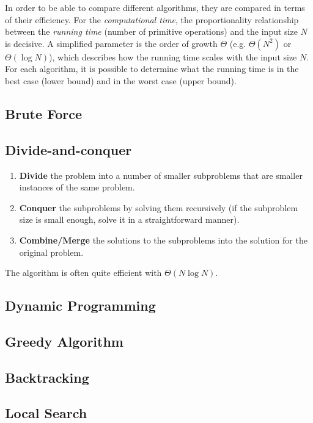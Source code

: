 

In order to be able to compare different algorithms, they are compared in terms of their efficiency. For the \emph{computational time}, the proportionality relationship between the \emph{running time} (number of primitive operations) and the input size $N$ is decisive. A simplified parameter is the order of growth $\Theta$ (e.g. $\Theta(N^2)$ or $\Theta(\log N)$), which describes how the running time scales with the input size $N$. For each algorithm, it is possible to determine what the running time is in the best case (lower bound) and in the worst case (upper bound).

\subsection{Brute Force}




\subsection{Divide-and-conquer}

\begin{enumerate}
    \item \textbf{Divide} the problem into a number of smaller subproblems that are smaller instances of the same problem.
    \item \textbf{Conquer} the subproblems by solving them recursively (if the subproblem size is small enough, solve it in a straightforward manner).
    \item \textbf{Combine/Merge} the solutions to the subproblems into the solution for the original problem.
\end{enumerate}

The algorithm is often quite efficient with $\Theta(N\log N)$.

\subsection{Dynamic Programming}

\subsection{Greedy Algorithm}

\subsection{Backtracking}

\subsection{Local Search}

%